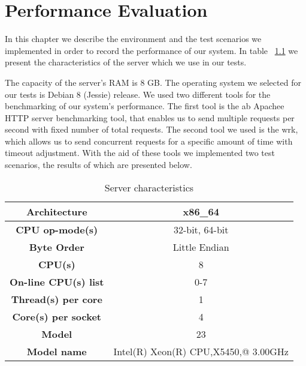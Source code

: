 \chapter{Performance Evaluation} %
\label{chapter6_pe}
In this chapter we describe the environment and the test scenarios we implemented in order to record the performance of our system. In table ~\ref{server_ch} we present the characteristics of the server which we use in our tests. \par 
	The capacity of the server's RAM is 8 GB. The operating system we selected for our tests is Debian 8 (Jessie) release. We used two different tools for the benchmarking of our system's performance. The first tool is the ab Apachee HTTP server benchmarking tool, that enables us to send multiple requests  per second with fixed number of total requests. The second tool we used is the wrk, which allows us to send concurrent requests for a specific amount of time with timeout adjustment. With the aid of these tools we implemented two test scenarios, the results of which are presented below. \par 


\begin{table}[]
\centering
\begin{tabular}{|c|c|}
\hline
\rowcolor[HTML]{34FF34} 
\textbf{Architecture}        & x86\_64                              \\ \hline
\rowcolor[HTML]{FFFFFF} 
\textbf{CPU op-mode(s)}      & 32-bit, 64-bit                       \\ \hline
\rowcolor[HTML]{34FF34} 
\textbf{Byte Order}          & Little Endian                        \\ \hline
\rowcolor[HTML]{FFFFFF} 
\textbf{CPU(s)}              & 8                                    \\ \hline
\rowcolor[HTML]{34FF34} 
\textbf{On-line CPU(s) list} & 0-7                                  \\ \hline
\rowcolor[HTML]{FFFFFF} 
\textbf{Thread(s) per core}  & 1                                    \\ \hline
\rowcolor[HTML]{34FF34} 
\textbf{Core(s) per socket}  & 4                                    \\ \hline
\rowcolor[HTML]{FFFFFF} 
\textbf{Model}               & 23                                   \\ \hline
\rowcolor[HTML]{34FF34} 
\textbf{Model name}          & Intel(R) Xeon(R) CPU,X5450,@ 3.00GHz \\ \hline
\end{tabular}
\caption{Server characteristics}
\label{server_ch}
\end{table}


